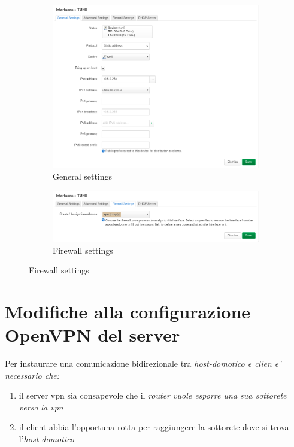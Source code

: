 \begin{figure}[H]
    \centering
    \begin{subfigure}{0.9\linewidth}
        \centering
        \includegraphics[width=0.7\linewidth]{immagini/LuCI_int_tun0_1}
        \caption{General settings}
        \label{fig:luci-firewall-interfaces}
    \end{subfigure}

    \begin{subfigure}{0.9\linewidth}
        \centering
        \includegraphics[width=0.7\linewidth]{immagini/LuCI_int_tun0_2}
        \caption{Firewall settings}
        \label{fig:luci-firewall-interfaces1}
    \end{subfigure}
\end{figure}


\section{Modifiche alla configurazione OpenVPN del server}

Per instaurare una comunicazione bidirezionale tra \it{host-domotico} e \it{clien} e' necessario che:

\begin{enumerate}
    \item il server vpn sia consapevole che il \it{router} vuole esporre una sua sottorete verso la vpn
    \item il client abbia l'opportuna rotta per raggiungere la sottorete dove si trova l'\it{host-domotico}
\end{enumerate}




